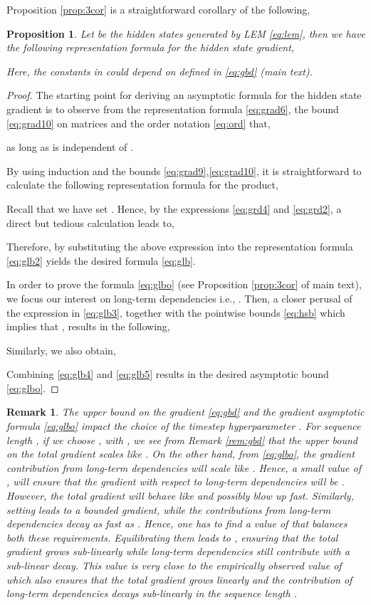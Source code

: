 \documentclass{article} \usepackage{iclr2022_conference,times}
\newtheorem{proposition}[theorem]{Proposition}
\newtheorem{remark}[theorem]{Remark}
\begin{document}
Proposition \ref{prop:3cor} is a straightforward corollary of the following, 
\begin{proposition}
Let  be the hidden states generated by LEM \eqref{eq:lem}, then we have the following representation formula for the hidden state gradient,
\label{prop:3}

Here, the constants in  could depend on  defined in \eqref{eq:gbd} (main text).
\end{proposition}
\begin{proof}
The starting point for deriving an asymptotic formula for the hidden state gradient  is to observe from the representation formula \eqref{eq:grad6}, the bound \eqref{eq:grad10} on matrices  and the order notation \eqref{eq:ord} that,

as long as  is independent of .

By using induction and the bounds \eqref{eq:grad9},\eqref{eq:grad10}, it is straightforward to calculate the following representation formula for the product, 

Recall that we have set . Hence, by the expressions \eqref{eq:grd4} and \eqref{eq:grd2}, a direct but tedious calculation leads to,

Therefore, by substituting the above expression into the representation formula \eqref{eq:glb2} yields the desired formula \eqref{eq:glb}.

In order to prove the formula \eqref{eq:glbo} (see Proposition \ref{prop:3cor} of main text), we focus our interest on long-term dependencies i.e., . Then, a closer perusal of the expression in \eqref{eq:glb3}, together with the pointwise bounds \eqref{eq:hsb} which implies that , results in the following,

Similarly, we also obtain,

Combining \eqref{eq:glb4} and \eqref{eq:glb5} results in the desired asymptotic bound \eqref{eq:glbo}.
\end{proof}
\begin{remark}
\label{rem:dtval}
The upper bound on the gradient \eqref{eq:gbd} and the gradient asymptotic formula \eqref{eq:glbo} impact the choice of the timestep hyperparameter . For sequence length , if we choose , with , we see from Remark \ref{rem:gbd} that the upper bound on the total gradient scales like . On the other hand, from \eqref{eq:glbo}, the gradient contribution from long-term dependencies will scale like . Hence, a small value of , will ensure that the gradient with respect to long-term dependencies will be . However, the total gradient will behave like  and possibly blow up fast. Similarly, setting  leads to a bounded gradient, while the contributions from long-term dependencies decay as fast as . Hence, one has to find a value of  that balances both these requirements. Equilibrating them leads to , ensuring that the total gradient grows sub-linearly while long-term dependencies still contribute with a sub-linear decay. This value is very close to the empirically observed value of  which also ensures that the total gradient grows linearly and the contribution of long-term dependencies decays sub-linearly in the sequence length .
\end{remark}
\end{document}
